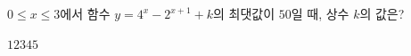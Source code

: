 $0\le x\le 3$에서 함수 $y=4^x-2^{x+1}+k$의 최댓값이 $50$일 때, 상수 $k$의 값은?
\begin{choices32}{$1$}{$2$}{$3$}{$4$}{$5$}\end{choices32}
